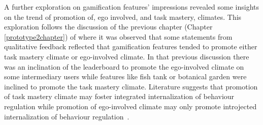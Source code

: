 A further exploration on  gamification features' impressions revealed some insights on the trend of promotion of, ego involved, and task mastery, climates. This exploration follows the discussion of the previous chapter (Chapter \ref{prototype2chapter}) of where it was observed that some statements from qualitative feedback reflected that gamification features tended to promote either task mastery climate or ego-involved climate. In that previous discussion there was an inclination of the leaderboard to promote the ego-involved climate on some intermediary users while features like fish tank or botanical garden were inclined to promote the task mastery climate. Literature suggests that promotion of task mastery climate may foster integrated internalization of behaviour regulation while promotion of ego-involved climate may only promote introjected internalization of behaviour regulation~\citep{saksono2015spaceship}.

